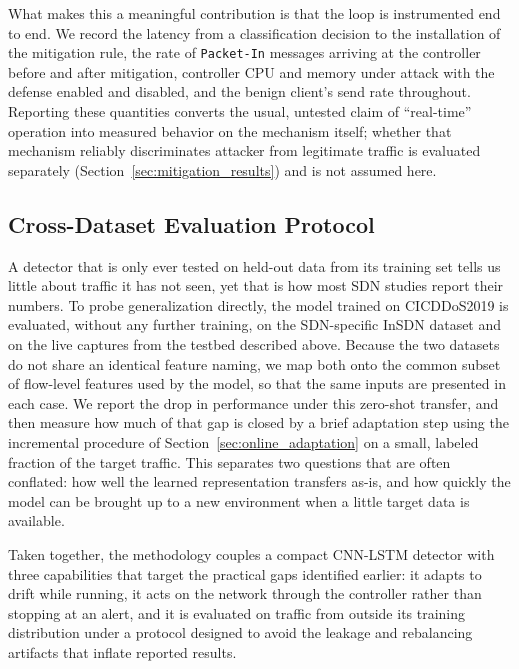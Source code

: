 \documentclass[ASNA,twocolumn]{USG} %
\begin{document}
What makes this a meaningful contribution is that the loop is instrumented end to end. We record the latency from a classification decision to the installation of the mitigation rule, the rate of \texttt{Packet-In} messages arriving at the controller before and after mitigation, controller CPU and memory under attack with the defense enabled and disabled, and the benign client's send rate throughout. Reporting these quantities converts the usual, untested claim of ``real-time'' operation into measured behavior on the mechanism itself; whether that mechanism reliably discriminates attacker from legitimate traffic is evaluated separately (Section~\ref{sec:mitigation_results}) and is not assumed here.

\subsection{Cross-Dataset Evaluation Protocol}
\label{sec:cross_dataset}

A detector that is only ever tested on held-out data from its training set tells us little about traffic it has not seen, yet that is how most SDN studies report their numbers. To probe generalization directly, the model trained on CICDDoS2019 is evaluated, without any further training, on the SDN-specific InSDN dataset \cite{elsayed2020insdn} and on the live captures from the testbed described above. Because the two datasets do not share an identical feature naming, we map both onto the common subset of flow-level features used by the model, so that the same inputs are presented in each case. We report the drop in performance under this zero-shot transfer, and then measure how much of that gap is closed by a brief adaptation step using the incremental procedure of Section~\ref{sec:online_adaptation} on a small, labeled fraction of the target traffic. This separates two questions that are often conflated: how well the learned representation transfers as-is, and how quickly the model can be brought up to a new environment when a little target data is available.

Taken together, the methodology couples a compact CNN-LSTM detector with three capabilities that target the practical gaps identified earlier: it adapts to drift while running, it acts on the network through the controller rather than stopping at an alert, and it is evaluated on traffic from outside its training distribution under a protocol designed to avoid the leakage and rebalancing artifacts that inflate reported results.
\end{document}
